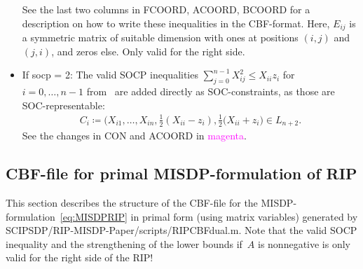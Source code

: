 \documentclass[11pt,a4paper]{article}
\newcommand{\define}{\coloneqq}
\theoremstyle{definition}
\begin{document}
\begin{itemize}
  See the last two columns in FCOORD, ACOORD, BCOORD for a description on
  how to write these inequalities in the CBF-format. Here, $E_{ij}$ is a
  symmetric matrix of suitable dimension with ones at positions $(i,j)$ and
  $(j,i)$, and zeros else. Only valid for the right side.
\item If socp = 2: The valid SOCP inequalities
  $\sum_{j=0}^{n-1}X_{ij}^2 \leq X_{ii}z_i$ for $i = 0,\dots,n-1$
  from~\cite{LiX20} are added directly as SOC-constraints, as those are
  SOC-representable:
  \begin{align*}
    C_i \define \big(X_{i1}, \dots, X_{in}, \tfrac{1}{2}(X_{ii}-z_i),
    \tfrac{1}{2}(X_{ii}+z_i \big) \in L_{n+2}.
  \end{align*}
  See the changes in CON and ACOORD in \textcolor{magenta}{magenta}.
\end{itemize}

\subsection{CBF-file for primal MISDP-formulation of RIP}
\label{sec:CBFprimal}
This section describes the structure of the CBF-file for the
MISDP-formulation~\eqref{eq:MISDPRIP} in primal form (using matrix variables)
generated by
\textsf{SCIPSDP/RIP-MISDP-Paper/scripts/RIPCBFdual.m}. Note that the valid
SOCP inequality and the strengthening of the lower bounds if~$A$ is
nonnegative is only valid for the right side of the RIP! \\
\end{document}
